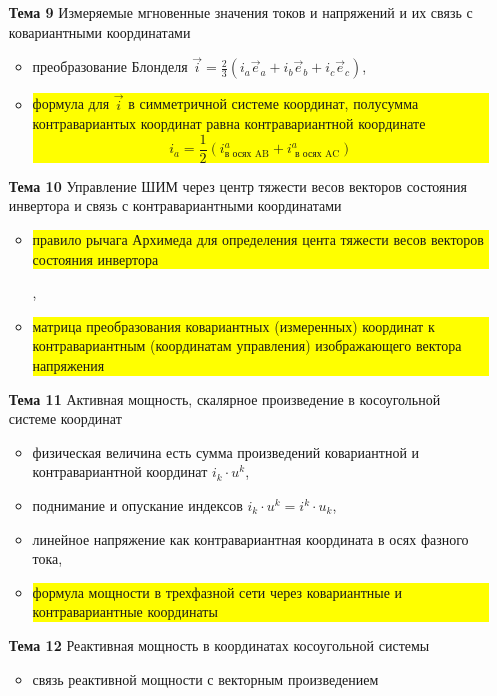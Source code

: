 \begin{itemize}
\begin{itemize}
  \end{itemize}
\item[\bf{Тема 9}]{Измеряемые мгновенные значения токов и напряжений и их связь с ковариантными координатами}
  \begin{itemize}
   \item преобразование Блонделя $\vec{i} = \frac{2}{3}\left(i_a \vec{e}_a + i_b \vec{e}_b + i_c \vec{e}_c\right)$,
   \item \colorbox{yellow}{\parbox[t]{\textwidth}{формула для $\vec{i}$ в симметричной системе координат, полусумма контравариантых координат равна контравариантной координате
         $$
             i_a = \frac{1}{2}\left(i^a_\text {в осях AB} + i^a_\text{ в осях AC} \right)
         $$}}
  \end{itemize}
\item[\bf{Тема 10}]{Управление ШИМ через центр тяжести весов векторов состояния инвертора и связь с контравариантными координатами}
   \begin{itemize}
   \item \colorbox{yellow}{\parbox[t]{\textwidth}{правило рычага Архимеда для определения цента тяжести весов векторов состояния инвертора}},
   \item \colorbox{yellow}{\parbox[t]{\textwidth}{матрица преобразования ковариантных (измеренных) координат к контравариантным (координатам управления) изображающего вектора напряжения}}
  \end{itemize}
\item[\bf{Тема 11}]{Активная мощность, скалярное произведение в косоугольной системе координат}
  \begin{itemize}
   \item физическая величина есть сумма произведений ковариантной и контравариантной координат $i_k\cdot u^k$,
   \item поднимание и опускание индексов $i_k\cdot u^k = i^k\cdot u_k$,
   \item линейное напряжение как контравариантная координата в осях фазного тока,
   \item \colorbox{yellow}{\parbox[t]{\textwidth}{формула мощности в трехфазной сети через ковариантные и контравариантные координаты}}
  \end{itemize}
\item[\bf{Тема 12}]{Реактивная мощность в координатах косоугольной системы}
  \begin{itemize}
  \item связь реактивной мощности с векторным произведением
  \end{itemize}

\end{itemize}
